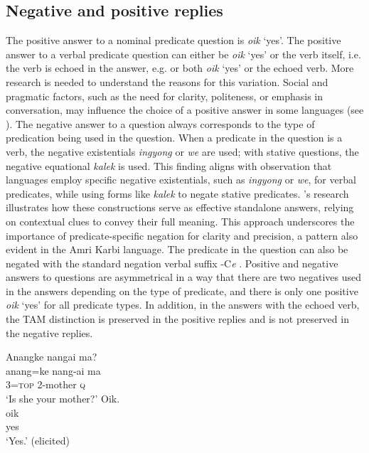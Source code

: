 \documentclass[output=paper,colorlinks,citecolor=brown]{langscibook}
\begin{document}
\subsection{Negative and positive replies}\label{sec:amr:3.1}
The positive answer to a nominal predicate question is \textit{oik} ‘yes’. The positive answer to a verbal predicate question can either be \textit{oik} ‘yes’ or the verb itself, i.e. the verb is echoed in the answer, e.g.  or both \textit{oik} ‘yes’ or the echoed verb. 
More research is needed to understand the reasons for this variation. Social and pragmatic factors, such as the need for clarity, politeness, or emphasis in conversation, may influence the choice of a positive answer in some languages (see \citealt{EnfieldEtAl2019}).
The negative answer to a question always corresponds to the type of predication being used in the question. When a predicate in the question is a verb, the negative existentials \textit{ingyong} or \textit{we} are used; with stative questions, the negative equational \textit{kalek} is used.
This finding aligns with  observation that languages employ specific negative existentials, such as \textit{ingyong} or \textit{we}, for verbal predicates, while using forms like \textit{kalek} to negate stative predicates. \citeauthor{Veselinova2013neg.exist}'s research illustrates how these constructions serve as effective standalone answers, relying on contextual clues to convey their full meaning. This approach underscores the importance of predicate-specific negation for clarity and precision, a pattern also evident in the Amri Karbi language.
The predicate in the question can also be negated with the standard negation verbal suffix -C\textit{e} . Positive and negative answers to questions are asymmetrical in a way that there are two negatives used in the answers depending on the type of predicate, and there is only one positive \textit{oik} ‘yes’ for all predicate types. In addition, in the answers with the echoed verb, the TAM distinction is preserved in the positive replies and is not preserved in the negative replies. 

\ea\label{ex:amr:37}
    \begin{xlist}
    Anangke nangai ma? \\ 
        \gll anang=ke nang-ai ma \\ 
              3=\textsc{top} 2-mother \textsc{q}\\
        \glt ‘Is she your mother?'
     Oik. \\ 
        \gll oik\\
               yes \\
        \glt ‘Yes.' (elicited)
    \end{xlist}
\z
\end{document}
